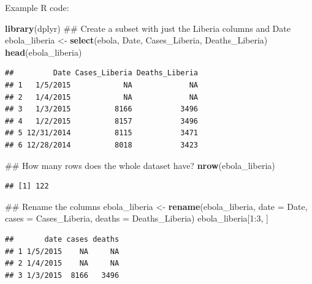 \documentclass[]{book}
\makeatletter
\newenvironment{Shaded}{\begin{snugshade}}{\end{snugshade}}
\newcommand{\KeywordTok}[1]{\textcolor[rgb]{0.13,0.29,0.53}{\textbf{{#1}}}}
\newcommand{\DataTypeTok}[1]{\textcolor[rgb]{0.13,0.29,0.53}{{#1}}}
\newcommand{\DecValTok}[1]{\textcolor[rgb]{0.00,0.00,0.81}{{#1}}}
\newcommand{\StringTok}[1]{\textcolor[rgb]{0.31,0.60,0.02}{{#1}}}
\newcommand{\NormalTok}[1]{{#1}}
\newenvironment{kframe}{%
\medskip{}
\setlength{\fboxsep}{.8em}
 \def\at@end@of@kframe{}%
 \ifinner\ifhmode%
  \def\at@end@of@kframe{\end{minipage}}%
  \begin{minipage}{\columnwidth}%
 \fi\fi%
 \def\FrameCommand##1{\hskip\@totalleftmargin \hskip-\fboxsep
 \colorbox{shadecolor}{##1}\hskip-\fboxsep
     \hskip-\linewidth \hskip-\@totalleftmargin \hskip\columnwidth}%
 \MakeFramed {\advance\hsize-\width
   \@totalleftmargin\z@ \linewidth\hsize
   \@setminipage}}%
 {\par\unskip\endMakeFramed%
 \at@end@of@kframe}
\renewenvironment{Shaded}{\begin{kframe}}{\end{kframe}}
\makeatother
\begin{document}
Example R code:

\begin{Shaded}
\begin{Highlighting}[]
\KeywordTok{library}\NormalTok{(dplyr)}
\NormalTok{## Create a subset with just the Liberia columns and Date}
\NormalTok{ebola_liberia <-}\StringTok{ }\KeywordTok{select}\NormalTok{(ebola, Date, Cases_Liberia, Deaths_Liberia)}
\KeywordTok{head}\NormalTok{(ebola_liberia)}
\end{Highlighting}
\end{Shaded}

\begin{verbatim}
##         Date Cases_Liberia Deaths_Liberia
## 1   1/5/2015            NA             NA
## 2   1/4/2015            NA             NA
## 3   1/3/2015          8166           3496
## 4   1/2/2015          8157           3496
## 5 12/31/2014          8115           3471
## 6 12/28/2014          8018           3423
\end{verbatim}

\begin{Shaded}
\begin{Highlighting}[]
\NormalTok{## How many rows does the whole dataset have?}
\KeywordTok{nrow}\NormalTok{(ebola_liberia)}
\end{Highlighting}
\end{Shaded}

\begin{verbatim}
## [1] 122
\end{verbatim}

\begin{Shaded}
\begin{Highlighting}[]
\NormalTok{## Rename the columns}
\NormalTok{ebola_liberia <-}\StringTok{ }\KeywordTok{rename}\NormalTok{(ebola_liberia,}
                        \DataTypeTok{date =} \NormalTok{Date,}
                        \DataTypeTok{cases =} \NormalTok{Cases_Liberia,}
                        \DataTypeTok{deaths =} \NormalTok{Deaths_Liberia)}
\NormalTok{ebola_liberia[}\DecValTok{1}\NormalTok{:}\DecValTok{3}\NormalTok{, ]}
\end{Highlighting}
\end{Shaded}

\begin{verbatim}
##       date cases deaths
## 1 1/5/2015    NA     NA
## 2 1/4/2015    NA     NA
## 3 1/3/2015  8166   3496
\end{verbatim}

\begin{Shaded}
\end{Shaded}
\end{document}
